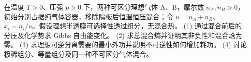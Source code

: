 在温度 \(T>0\)、压强 \(p>0\) 下，两种可区分理想气体 A、B，摩尔数 \(n_A,n_B>0\)，初始分别占据纯气体容器，移除隔板后恒温恒压混合；令 \(n=n_A+n_B\)、\(x_i=n_i/n\)。假设理想半透膜可选择性透过组分，无混合热。
(1) 通过混合前后的分压及化学势求 Gibbs 自由能变化。
(2) 求总混合熵并证明其非负性和混合焓为零。
(3) 求理想可逆分离需要的最小外功并说明不可逆性如何增加耗功。
(4) 讨论极稀组分、等量组分及同一种不可区分气体混合。
